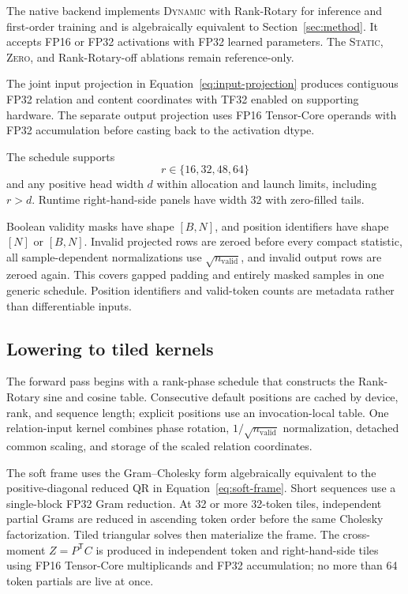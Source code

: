 \documentclass[10pt]{article}
\newcommand{\T}{\mathsf{T}}
\begin{document}
The native backend implements \textsc{Dynamic} with Rank-Rotary for inference
and first-order training and is algebraically equivalent to
Section~\ref{sec:method}.  It accepts FP16 or FP32 activations with FP32 learned
parameters.  The \textsc{Static}, \textsc{Zero}, and Rank-Rotary-off ablations
remain reference-only.

The joint input projection in Equation~\eqref{eq:input-projection} produces
contiguous FP32 relation and content coordinates with TF32 enabled on
supporting hardware.  The separate output projection uses FP16 Tensor-Core
operands with FP32 accumulation before casting back to the activation dtype.

The schedule supports
\begin{equation}
    r\in\{16,32,48,64\}
\end{equation}
and any positive head width $d$ within allocation and launch limits, including
$r>d$.  Runtime right-hand-side panels have width 32 with zero-filled tails.

Boolean validity masks have shape $[B,N]$, and position identifiers have shape
$[N]$ or $[B,N]$.  Invalid projected rows are zeroed before every compact
statistic, all sample-dependent normalizations use
$\sqrt{n_{\mathrm{valid}}}$, and invalid output rows are zeroed again.  This
covers gapped padding and entirely masked samples in one generic schedule.
Position identifiers and valid-token counts are metadata rather than
differentiable inputs.

\subsection{Lowering to tiled kernels}

The forward pass begins with a rank-phase schedule that constructs the
Rank-Rotary sine and cosine table.  Consecutive default positions are cached by
device, rank, and sequence length; explicit positions use an invocation-local
table.  One relation-input kernel combines phase rotation,
$1/\sqrt{n_{\mathrm{valid}}}$ normalization, detached common scaling, and
storage of the scaled relation coordinates.

The soft frame uses the Gram--Cholesky form algebraically equivalent to the
positive-diagonal reduced QR in Equation~\eqref{eq:soft-frame}.  Short
sequences use a single-block FP32 Gram reduction.  At 32 or more 32-token
tiles, independent partial Grams are reduced in ascending token order before
the same Cholesky factorization.  Tiled triangular solves then materialize the
frame.  The cross-moment $Z=P^\T C$ is produced in independent token and
right-hand-side tiles using FP16 Tensor-Core multiplicands and FP32
accumulation; no more than 64 token partials are live at once.
\end{document}
